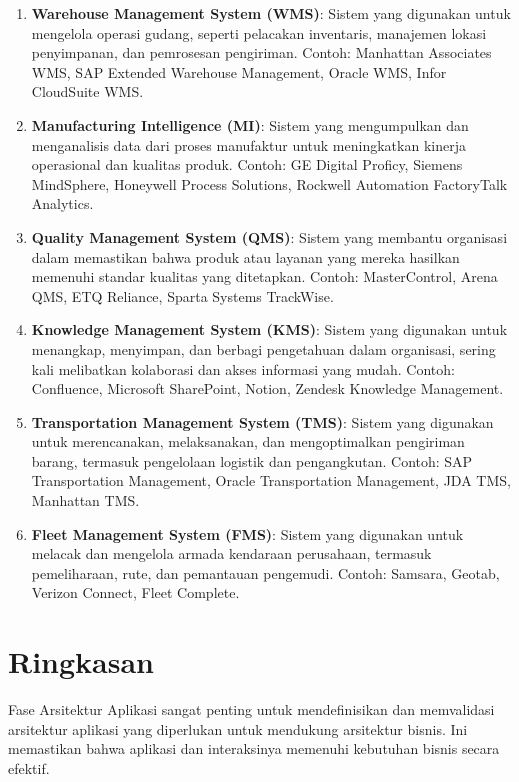 \begin{enumerate}
	\item \textbf{Warehouse Management System (WMS)}: Sistem yang digunakan untuk mengelola operasi gudang, seperti pelacakan inventaris, manajemen lokasi penyimpanan, dan pemrosesan pengiriman. Contoh: Manhattan Associates WMS, SAP Extended Warehouse Management, Oracle WMS, Infor CloudSuite WMS.
	
	\item \textbf{Manufacturing Intelligence (MI)}: Sistem yang mengumpulkan dan menganalisis data dari proses manufaktur untuk meningkatkan kinerja operasional dan kualitas produk. Contoh: GE Digital Proficy, Siemens MindSphere, Honeywell Process Solutions, Rockwell Automation FactoryTalk Analytics.
	
	\item \textbf{Quality Management System (QMS)}: Sistem yang membantu organisasi dalam memastikan bahwa produk atau layanan yang mereka hasilkan memenuhi standar kualitas yang ditetapkan. Contoh: MasterControl, Arena QMS, ETQ Reliance, Sparta Systems TrackWise.
	
	\item \textbf{Knowledge Management System (KMS)}: Sistem yang digunakan untuk menangkap, menyimpan, dan berbagi pengetahuan dalam organisasi, sering kali melibatkan kolaborasi dan akses informasi yang mudah. Contoh: Confluence, Microsoft SharePoint, Notion, Zendesk Knowledge Management.
	
	\item \textbf{Transportation Management System (TMS)}: Sistem yang digunakan untuk merencanakan, melaksanakan, dan mengoptimalkan pengiriman barang, termasuk pengelolaan logistik dan pengangkutan. Contoh: SAP Transportation Management, Oracle Transportation Management, JDA TMS, Manhattan TMS.
	
	\item \textbf{Fleet Management System (FMS)}: Sistem yang digunakan untuk melacak dan mengelola armada kendaraan perusahaan, termasuk pemeliharaan, rute, dan pemantauan pengemudi. Contoh: Samsara, Geotab, Verizon Connect, Fleet Complete.
\end{enumerate}



\section{Ringkasan}
Fase Arsitektur Aplikasi sangat penting untuk mendefinisikan dan memvalidasi arsitektur aplikasi yang diperlukan untuk mendukung arsitektur bisnis. Ini memastikan bahwa aplikasi dan interaksinya memenuhi kebutuhan bisnis secara efektif.

